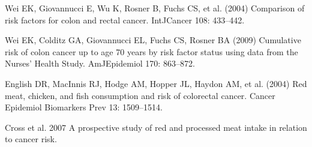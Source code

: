\documentclass{article}
\begin{document}
\begin{thebibliography}{1}
Wei EK, Giovannucci E, Wu K, Rosner B, Fuchs CS, et al. (2004) Comparison
of risk factors for colon and rectal cancer. IntJCancer 108: 433–442.

Wei EK, Colditz GA, Giovannucci EL, Fuchs CS, Rosner BA (2009)
Cumulative risk of colon cancer up to age 70 years by risk factor status using
data from the Nurses’ Health Study. AmJEpidemiol 170: 863–872.

English DR, MacInnis RJ, Hodge AM, Hopper JL, Haydon AM, et al. (2004)
Red meat, chicken, and fish consumption and risk of colorectal cancer. Cancer
Epidemiol Biomarkers Prev 13: 1509–1514.

Cross et al. 2007
A prospective study of red and processed meat intake in relation to cancer risk.

\end{thebibliography}
\end{document}
